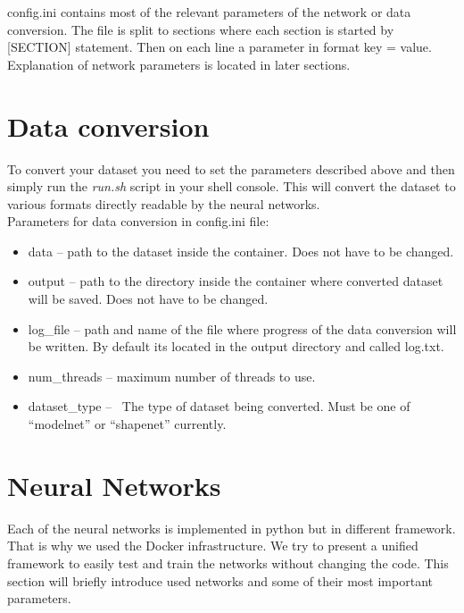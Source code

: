 config.ini contains most of the relevant parameters of the network or data conversion. The file is split to sections where each section is started by [SECTION] statement. Then on each line a parameter in format key = value. Explanation of network parameters is located in later sections.

\section{Data conversion}
To convert your dataset you need to set the parameters described above and then simply run the \textit{run.sh} script in your shell console. This will convert the dataset to various formats directly readable by the neural networks.\\
Parameters for data conversion in config.ini file:
\begin{itemize}
	\item  {data -- path to the dataset inside the container. Does not have to be changed.}
	\item{output -- path to the directory inside the container where converted dataset will be saved. Does not have to be changed.}
	\item{log\_file -- path and name of the file where progress of the data conversion will be written. By default its located in the output directory and called log.txt.}
	\item{num\_threads -- maximum number of threads to use.}
	\item{dataset\_type --  The type of dataset being converted. Must be one of ``modelnet'' or ``shapenet'' currently.}
\end{itemize}

\section{Neural Networks}
Each of the neural networks is implemented in python but in different framework. That is why we used the Docker infrastructure. We try to present a unified framework to easily test and train the networks without changing the code. This section will briefly introduce used networks and some of their most important parameters.\\

